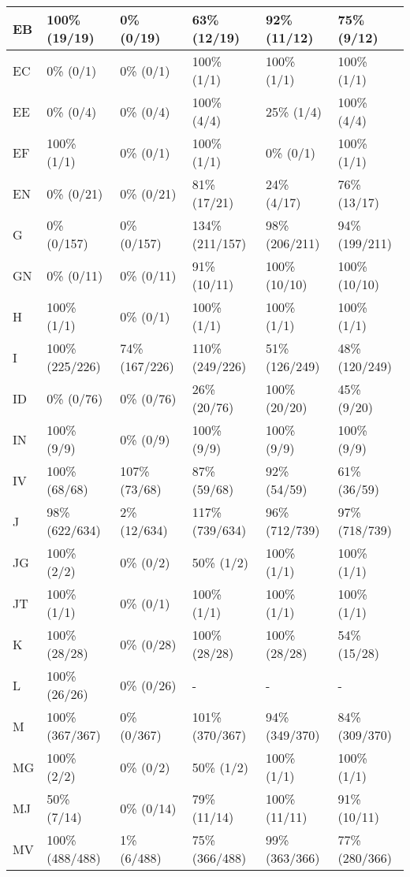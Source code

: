 \begin{figure*}
\begin{tabular}{|l|l|l|l|l|l|}
\hline
EB & 100\% (19/19) & 0\% (0/19) & 63\% (12/19) & 92\% (11/12) & 75\% (9/12) \\ 
\hline
EC & 0\% (0/1) & 0\% (0/1) & 100\% (1/1) & 100\% (1/1) & 100\% (1/1) \\ 
\hline
EE & 0\% (0/4) & 0\% (0/4) & 100\% (4/4) & 25\% (1/4) & 100\% (4/4) \\ 
\hline
EF & 100\% (1/1) & 0\% (0/1) & 100\% (1/1) & 0\% (0/1) & 100\% (1/1) \\ 
\hline
EN & 0\% (0/21) & 0\% (0/21) & 81\% (17/21) & 24\% (4/17) & 76\% (13/17) \\ 
\hline
G & 0\% (0/157) & 0\% (0/157) & 134\% (211/157) & 98\% (206/211) & 94\% (199/211) \\ 
\hline
GN & 0\% (0/11) & 0\% (0/11) & 91\% (10/11) & 100\% (10/10) & 100\% (10/10) \\ 
\hline
H & 100\% (1/1) & 0\% (0/1) & 100\% (1/1) & 100\% (1/1) & 100\% (1/1) \\ 
\hline
I & 100\% (225/226) & 74\% (167/226) & 110\% (249/226) & 51\% (126/249) & 48\% (120/249) \\ 
\hline
ID & 0\% (0/76) & 0\% (0/76) & 26\% (20/76) & 100\% (20/20) & 45\% (9/20) \\ 
\hline
IN & 100\% (9/9) & 0\% (0/9) & 100\% (9/9) & 100\% (9/9) & 100\% (9/9) \\ 
\hline
IV & 100\% (68/68) & 107\% (73/68) & 87\% (59/68) & 92\% (54/59) & 61\% (36/59) \\ 
\hline
J & 98\% (622/634) & 2\% (12/634) & 117\% (739/634) & 96\% (712/739) & 97\% (718/739) \\ 
\hline
JG & 100\% (2/2) & 0\% (0/2) & 50\% (1/2) & 100\% (1/1) & 100\% (1/1) \\ 
\hline
JT & 100\% (1/1) & 0\% (0/1) & 100\% (1/1) & 100\% (1/1) & 100\% (1/1) \\ 
\hline
K & 100\% (28/28) & 0\% (0/28) & 100\% (28/28) & 100\% (28/28) & 54\% (15/28) \\ 
\hline
L & 100\% (26/26) & 0\% (0/26) & - & - & - \\ 
\hline
M & 100\% (367/367) & 0\% (0/367) & 101\% (370/367) & 94\% (349/370) & 84\% (309/370) \\ 
\hline
MG & 100\% (2/2) & 0\% (0/2) & 50\% (1/2) & 100\% (1/1) & 100\% (1/1) \\ 
\hline
MJ & 50\% (7/14) & 0\% (0/14) & 79\% (11/14) & 100\% (11/11) & 91\% (10/11) \\ 
\hline
MV & 100\% (488/488) & 1\% (6/488) & 75\% (366/488) & 99\% (363/366) & 77\% (280/366) \\ 

\end{tabular}
\end{figure*}
